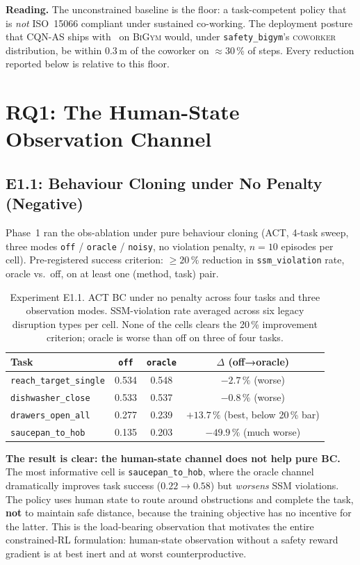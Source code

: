 \documentclass[11pt,a4paper]{report}
\newcommand{\ssm}{SSM}
\newcommand{\iso}{ISO~15066}
\newcommand{\bigym}{\textsc{BiGym}}
\newcommand{\sbigym}{\texttt{safety\_bigym}}
\newcommand{\cqnas}{CQN-AS}
\newcommand{\coworker}{\textsc{coworker}}
\begin{document}
\textbf{Reading.} The unconstrained baseline is the floor: a
task-competent policy that is \emph{not} \iso{} compliant under
sustained co-working. The deployment posture that \cqnas{}
ships with~\cite{seo2024cqnas} on \bigym{} would, under \sbigym{}'s
\coworker{} distribution, be within $0.3$\,m of the coworker on
$\approx$30\,\% of steps. Every reduction reported below is relative to
this floor.

\section{RQ1: The Human-State Observation Channel}
\label{sec:results:obs}

\subsection{E1.1: Behaviour Cloning under No Penalty (Negative)}
\label{sec:results:obs-bc}

Phase~1 ran the obs-ablation under pure behaviour cloning (ACT,
4-task sweep, three modes \texttt{off} / \texttt{oracle} /
\texttt{noisy}, no violation penalty, $n=10$ episodes per cell).
Pre-registered success criterion: $\geq 20\,\%$ reduction in
\texttt{ssm\_violation} rate, oracle vs.\ off, on at least one
(method, task) pair.

\begin{table}[h]
\centering
\caption{Experiment E1.1. ACT BC under no penalty across four tasks
and three observation modes. SSM-violation rate averaged across six
legacy disruption types per cell. None of the cells clears the
20\,\% improvement criterion; oracle is worse than off on three of
four tasks.}
\label{tab:e1.1-bc-ablation}
\small
\begin{tabular}{lccc}
\toprule
Task & \texttt{off} & \texttt{oracle} & $\Delta$ (off→oracle) \\
\midrule
\texttt{reach\_target\_single} & 0.534 & 0.548 & $-2.7\,\%$ (worse) \\
\texttt{dishwasher\_close}     & 0.533 & 0.537 & $-0.8\,\%$ (worse) \\
\texttt{drawers\_open\_all}    & 0.277 & 0.239 & $+13.7\,\%$ (best, below 20\,\% bar) \\
\texttt{saucepan\_to\_hob}     & 0.135 & 0.203 & $-49.9\,\%$ (much worse) \\
\bottomrule
\end{tabular}
\end{table}

\textbf{The result is clear: the human-state channel does not help
pure BC.} The most informative cell is \texttt{saucepan\_to\_hob},
where the oracle channel dramatically improves task success
($0.22 \to 0.58$) but \emph{worsens} \ssm{} violations. The policy
uses human state to route around obstructions and complete the
task, \textbf{not} to maintain safe distance, because the
training objective has no incentive for the latter. This is the
load-bearing observation that motivates the entire constrained-RL
formulation: human-state observation without a safety reward
gradient is at best inert and at worst counterproductive.
\end{document}
